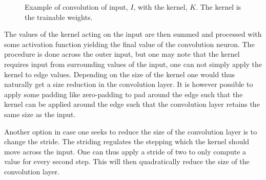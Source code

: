 \documentclass[11pt,a4paper]{article} %
\newcommand\numRowsK{3}
\newcommand\numColsK{3}
\newcommand{\K}[2]{%
	\edef\Kcol##1##2##3{###2}%
	\edef\Krow##1##2##3{\noexpand\Kcol###1}%
	\Krow
	{1 0 1}
	{0 1 0}
	{1 0 1}%
}
\numberwithin{equation}{section}
\begin{document}
\begin{figure}
    		\caption{Example of convolution of input, $I$, with the kernel, $K$. The kernel is the trainable weights.}
    		\label{fig:convolution}
    	\end{figure}
    	
    	The values of the kernel acting on the input are then summed and processed with some activation function yielding the final value of the convolution neuron. The procedure is done across the outer input, but one may note that the kernel requires input from surrounding values of the input, one can not simply apply the kernel to edge values. Depending on the size of the kernel one would thus naturally get a size reduction in the convolution layer. It is however possible to apply some padding like zero-padding to pad around the edge such that the kernel can be applied around the edge such that the convolution layer retains the same size as the input.
    	
    	Another option in case one seeks to reduce the size of the convolution layer is to change the stride. The striding regulates the stepping which the kernel should move across the input. One can thus apply a stride of two to only compute a value for every second step. This will then quadratically reduce the size of the convolution layer.
    	
\end{document}
